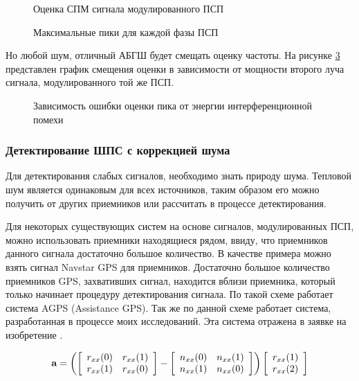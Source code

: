 \begin{figure}[H]
	\center{}
	\caption{Оценка СПМ сигнала модулированного ПСП}
	\label{pic:lpc_psd_1}
\end{figure}
\begin{figure}[H]
	\center{}
	\caption{Максимальные пики для каждой фазы ПСП}
	\label{pic:lpc_1sat_energy}
\end{figure}

Но любой шум, отличный АБГШ будет смещать оценку частоты. На рисунке \ref{pic:lpc_1sat_interference}
представлен график смещения оценки в зависимости от мощности второго луча сигнала, модулированного
той же ПСП.

\begin{figure}[H]
	\center{}
	\caption{Зависимость ошибки оценки пика от энергии интерференционной помехи}
	\label{pic:lpc_1sat_interference}
\end{figure}

\subsubsection{Детектирование ШПС с коррекцией шума}

Для детектирования слабых сигналов, необходимо знать природу шума. Тепловой шум является одинаковым для всех источников,
таким образом его можно получить от других приемников или рассчитать в процессе детектирования. 

Для некоторых существующих систем на основе сигналов, модулированных ПСП, можно использовать приемники находящиеся рядом,
ввиду, что приемников данного сигнала достаточно большое количество. В качестве примера можно взять сигнал Navstar GPS
для приемников. Достаточно большое количество приемников GPS, захвативших сигнал, находится вблизи приемника, который
только начинает процедуру детектирования сигнала. По такой схеме работает система AGPS (Assistance GPS). Так же по данной
схеме работает система, разработанная в процессе моих исследований. Эта система отражена в заявке на изобретение
\cite{patent_my}.

\begin{center}
\begin{equation}
	\label{eq:lpc_gps_1}
	{\bf a} = 
		\left(
			\left[ \begin{array}{cc}
				r_{xx}(0) & r_{xx}(1) \\
				r_{xx}(1) & r_{xx}(0)
			\end{array} \right] -
			\left[ \begin{array}{cc}
				n_{xx}(0) & n_{xx}(1) \\
				n_{xx}(1) & n_{xx}(0)
			\end{array} \right] 
		\right)
		\left[ \begin{array}{c}
			r_{xx}(1) \\
			r_{xx}(2)
		\end{array} \right]
\end{equation}



\end{center}
\newpage
